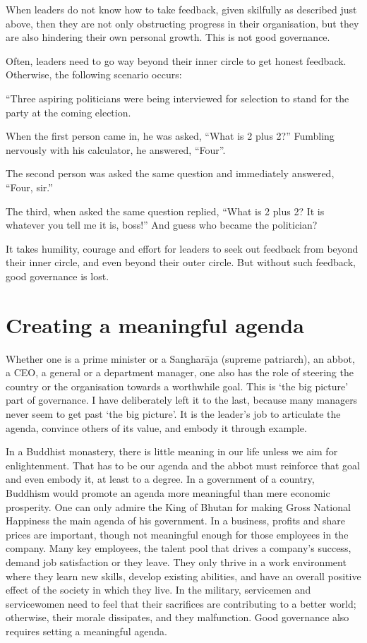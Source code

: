 \documentclass[11pt, openany]{book}
\begin{document}
When leaders do not know how to take feedback, given skilfully as described just above, then they are not only obstructing progress in their organisation, but they are also hindering their own personal growth. This is not good governance.

Often, leaders need to go way beyond their inner circle to get honest feedback. Otherwise, the following scenario occurs:

“Three aspiring politicians were being interviewed for selection to stand for the party at the coming election.

When the first person came in, he was asked, “What is 2 plus 2?” Fumbling nervously with his calculator, he answered, “Four”.

The second person was asked the same question and immediately answered, “Four, sir.”

The third, when asked the same question replied, “What is 2 plus 2? It is whatever you tell me it is, boss!” And guess who became the politician?

It takes humility, courage and effort for leaders to seek out feedback from beyond their inner circle, and even beyond their outer circle. But without such feedback, good governance is lost.

\section{Creating a meaningful agenda}

Whether one is a prime minister or a Sangharāja (supreme
 patriarch), an abbot, a CEO, a general or a department manager, one also has the role of steering the country or the organisation towards a worthwhile goal. This is ‘the big picture’ part of governance. I have deliberately left it to the last, because many managers never seem to get past ‘the big picture’. It is the leader’s job to articulate the agenda, convince others of its value, and embody it through example.

In a Buddhist monastery, there is little meaning in our life unless we aim for enlightenment. That has to be our agenda and the abbot must reinforce that goal and even embody it, at least to a degree. In a government of a country, Buddhism would promote an agenda more meaningful than mere economic prosperity. One can only admire the King of Bhutan for making Gross National Happiness the main agenda of his government. In a business, profits and share prices are important, though not meaningful enough for those employees in the company. Many key employees, the talent pool that drives a company’s success, demand job satisfaction or they leave. They only thrive in a work environment where they learn new skills, develop existing abilities, and have an overall positive effect of the society in which they live. In the military, servicemen and servicewomen need to feel that their sacrifices are contributing to a better world; otherwise, their morale dissipates, and they malfunction. Good governance also requires setting a meaningful agenda.
\end{document}
